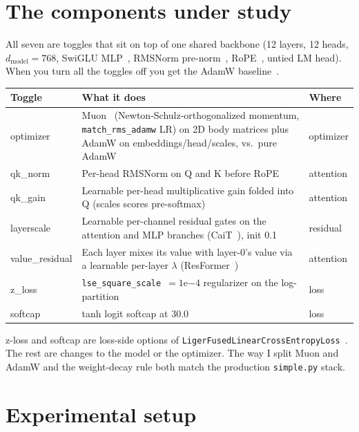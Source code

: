 \documentclass[11pt]{article}
\begin{document}
\section{The components under study}

All seven are toggles that sit on top of one shared backbone (12 layers, 12 heads,
$d_{\text{model}}=768$, SwiGLU MLP~\cite{shazeer2020glu}, RMSNorm
pre-norm~\cite{zhang2019rmsnorm}, RoPE~\cite{su2024roformer}, untied LM head). When
you turn all the toggles off you get the AdamW baseline~\cite{loshchilov2019adamw}.

\begin{table}[h]
\centering
\small
\begin{tabular}{@{}lp{8.2cm}l@{}}
\toprule
\textbf{Toggle} & \textbf{What it does} & \textbf{Where} \\
\midrule
optimizer & Muon~\cite{jordan2024muon} (Newton-Schulz-orthogonalized momentum, \texttt{match\_rms\_adamw} LR) on 2D body matrices plus AdamW on embeddings/head/scales, vs.\ pure AdamW & optimizer \\
qk\_norm & Per-head RMSNorm on Q and K before RoPE~\cite{henry2020qknorm} & attention \\
qk\_gain & Learnable per-head multiplicative gain folded into Q (scales scores pre-softmax) & attention \\
layerscale & Learnable per-channel residual gates on the attention and MLP branches (CaiT~\cite{touvron2021cait}), init 0.1 & residual \\
value\_residual & Each layer mixes its value with layer-0's value via a learnable per-layer $\lambda$ (ResFormer~\cite{zhou2024resformer}) & attention \\
z\_loss & \texttt{lse\_square\_scale}~$=1\mathrm{e}{-4}$ regularizer on the log-partition~\cite{chowdhery2023palm} & loss \\
softcap & tanh logit softcap at 30.0 & loss \\
\bottomrule
\end{tabular}
\end{table}

z-loss and softcap are loss-side options of
\texttt{LigerFusedLinearCrossEntropyLoss}~\cite{hsu2024liger}. The rest are changes
to the model or the optimizer. The way I split Muon and AdamW and the weight-decay
rule both match the production \texttt{simple.py} stack.

\section{Experimental setup}
\end{document}
